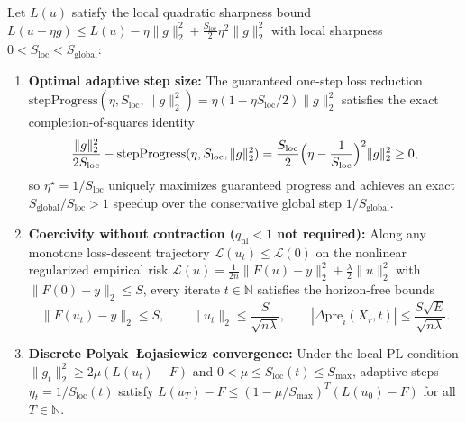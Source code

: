 \begin{lemma}\label{lem:local_sharpness_descent}
\leanok
{}
Let $L(u)$ satisfy the local quadratic sharpness bound $L(u - \eta g) \le L(u) - \eta\|g\|_2^2 + \frac{S_{\mathrm{loc}}}{2}\eta^2\|g\|_2^2$ with local sharpness $0 < S_{\mathrm{loc}} < S_{\mathrm{global}}$:
\begin{enumerate}
\item \textbf{Optimal adaptive step size:} The guaranteed one-step loss reduction $\mathrm{stepProgress}(\eta, S_{\mathrm{loc}}, \|g\|_2^2) = \eta(1 - \eta S_{\mathrm{loc}}/2)\|g\|_2^2$ satisfies the exact completion-of-squares identity
\[
\frac{\|g\|_2^2}{2 S_{\mathrm{loc}}} - \mathrm{stepProgress}(\eta, S_{\mathrm{loc}}, \|g\|_2^2) = \frac{S_{\mathrm{loc}}}{2}\Bigl(\eta - \frac{1}{S_{\mathrm{loc}}}\Bigr)^2 \|g\|_2^2 \ge 0,
\]
so $\eta^\star = 1/S_{\mathrm{loc}}$ uniquely maximizes guaranteed progress and achieves an exact $S_{\mathrm{global}}/S_{\mathrm{loc}} > 1$ speedup over the conservative global step $1/S_{\mathrm{global}}$.
\item \textbf{Coercivity without contraction ($q_{\mathrm{nl}} < 1$ not required):} Along any monotone loss-descent trajectory $\mathcal{L}(u_t) \le \mathcal{L}(0)$ on the nonlinear regularized empirical risk $\mathcal{L}(u) = \frac{1}{2n}\|F(u)-y\|_2^2 + \frac{\lambda}{2}\|u\|_2^2$ with $\|F(0)-y\|_2\le S$, every iterate $t\in\mathbb{N}$ satisfies the horizon-free bounds
\[
\|F(u_t)-y\|_2 \le S,\qquad \|u_t\|_2 \le \frac{S}{\sqrt{n\lambda}},\qquad |\Delta\mathrm{pre}_i(X_r, t)| \le \frac{S\sqrt{E}}{\sqrt{n\lambda}}.
\]
\item \textbf{Discrete Polyak--{\L}ojasiewicz convergence:} Under the local PL condition $\|g_t\|_2^2 \ge 2\mu(L(u_t)-F)$ and $0 < \mu \le S_{\mathrm{loc}}(t) \le S_{\max}$, adaptive steps $\eta_t = 1/S_{\mathrm{loc}}(t)$ satisfy $L(u_T) - F \le (1 - \mu/S_{\max})^T (L(u_0) - F)$ for all $T\in\mathbb{N}$.
\end{enumerate}
\end{lemma}
